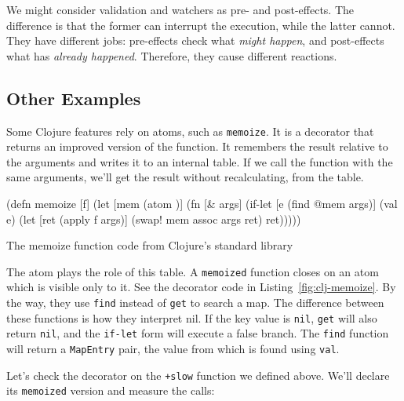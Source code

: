\fi

We might consider validation and watchers as pre- and post-effects.
The difference is that the former can interrupt the execution, while the latter cannot.
They have different jobs: pre-effects check what \emph{might happen}, and post-effects what has \emph {already happened}.
Therefore, they cause different reactions.

\subsection{Other Examples}


Some Clojure features rely on atoms, such as \verb|memoize|.
It is a decorator that returns an improved version of the function.
It remembers the result relative to the arguments and writes it to an internal table.
If we call the function with the same arguments, we'll get the result without recalculating, from the table.

\begin{listing}[ht!]

\begin{english}
  \begin{clojure}
(defn memoize [f]
  (let [mem (atom {})]
    (fn [& args]
      (if-let [e (find @mem args)]
        (val e)
        (let [ret (apply f args)]
          (swap! mem assoc args ret)
          ret)))))
  \end{clojure}
\end{english}

\caption{The memoize function code from Clojure's standard library}
\label{fig:clj-memoize}

\end{listing}


The atom plays the role of this table.
A \verb|memoized| function closes on an atom which is visible only to it.
See the decorator code in Listing~\ref{fig:clj-memoize}.
By the way, they use \verb|find| instead of \verb|get| to search a map. The difference between these functions is how they interpret nil. If the key value is \verb|nil|, \verb|get| will also return \verb|nil|, and the \verb|if-let| form will execute a false branch.
The \verb|find| function will return a \verb|MapEntry| pair, the value from which is found using \verb|val|.

Let's check the decorator on the \verb|+slow| function we defined above. We'll declare its \verb|memoized| version and measure the calls:

